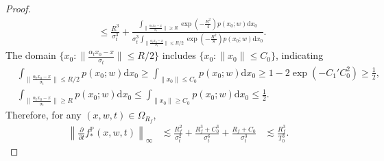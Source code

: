 \documentclass[10pt,a4paper]{amsart}
\newcommand{\dif}{\mathrm{d}}
\renewcommand{\P}{\mathbb{P}}
\begin{document}
\begin{proof}
\begin{equation}
\begin{aligned}
            &\leq \frac{R^3}{\sigma_t^3} + \frac{\int_{\|\frac{\alpha_tx_0-x}{\sigma_t}\|\geq R} \exp(-\frac{R^2}{4})p(x_0;w)\dif x_0}{\sigma_t^3\int_{\|\frac{\alpha_tx_0-x}{\sigma_t}\|\leq R/2} \exp(-\frac{R^2}{8})p(x_0;w)\dif x_0}.
        \end{aligned}
    \end{equation}
    The domain $\Big\{x_0:\|\frac{\alpha_tx_0-x}{\sigma_t}\|\leq R/2\Big\}$ includes $\Big\{x_0:\|x_0\|\leq C_0\Big\}$, indicating
    \begin{equation}
        \begin{aligned}
            &\int_{\|\frac{\alpha_tx_0-x}{\sigma_t}\|\leq R/2} p(x_0;w)\dif x_0\geq  \int_{\|x_0\|\leq C_0} p(x_0;w)\dif x_0 \geq 1-2\exp(-C_1'C_0^2)\geq \frac{1}{2},\\
            &\int_{\|\frac{\alpha_tx_0-x}{\sigma_t}\|\geq R} p(x_0;w)\dif x_0\leq  \int_{\|x_0\|\geq C_0} p(x_0;w)\dif x_0 \leq \frac{1}{2}.
        \end{aligned}
    \end{equation}
    Therefore, for any $(x,w,t)\in\Omega_{R_f}$,
    \begin{equation}
        \begin{aligned}
            \left\|\frac{\partial}{\partial t}f_*^\P(x,w,t)\right\|_\infty
            &\lesssim \frac{R_f^2}{\sigma_t^2}+\frac{R_f^3+C_0^3}{\sigma_t^6}+\frac{R_f+C_0}{\sigma_t^3}
            &\lesssim \frac{R_f^3}{T_0^3}.
        \end{aligned}
    \end{equation}
\end{proof}
\end{document}
